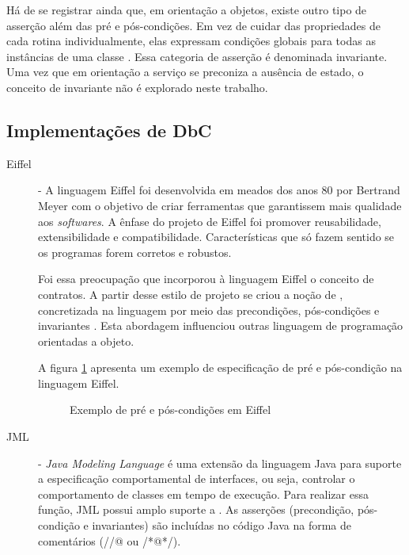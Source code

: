 Há de se registrar ainda que, em orientação a objetos, existe outro tipo de
asserção além das pré e pós-condições. Em vez de cuidar das propriedades de cada
rotina individualmente, elas expressam condições globais para todas as
instâncias de uma classe \cite{meyer1997object}. Essa categoria de
asserção é denominada invariante. Uma vez que em orientação a serviço se
preconiza a ausência de estado, o conceito de invariante não é explorado neste trabalho.



\subsection{Implementações de DbC}
\label{implementDbC}

\begin{description}
\item[Eiffel] - A linguagem Eiffel foi desenvolvida em meados dos anos 80 por
Bertrand Meyer \cite{meyer1988eiffel} com o objetivo de criar ferramentas que
garantissem mais qualidade aos \textit{softwares}. A ênfase do projeto de
Eiffel foi promover reusabilidade, extensibilidade e compatibilidade.
Características que só fazem sentido se os programas forem corretos e
robustos.

Foi essa preocupação que incorporou à linguagem Eiffel o conceito de contratos.
A partir desse estilo de projeto se criou a noção de \designbycontract{},
concretizada na linguagem por meio das precondições, pós-condições e invariantes
\cite{meyer1988eiffel}. Esta abordagem influenciou outras linguagem de programação orientadas a objeto.

A figura \ref{lst:exemploEiffel} apresenta um exemplo de especificação de pré e
pós-condição na linguagem Eiffel.

\vspace{6mm}

\begin{figure}[h]
\begin{small}

\vspace{-.5cm}
\end{small}
\caption{Exemplo de pré e pós-condições em Eiffel}
\label{lst:exemploEiffel}
\end{figure}


\item[JML] - \textit{Java Modeling Language} é uma extensão da linguagem Java
para suporte a especificação comportamental de interfaces, ou seja, controlar o
comportamento de classes em tempo de execução. Para realizar essa função, JML
possui amplo suporte a \designbycontract{}. As asserções (precondição,
pós-condição e invariantes) são incluídas no código Java na forma de comentários
(//@ ou /*@\ldots@*/).


\end{description}
